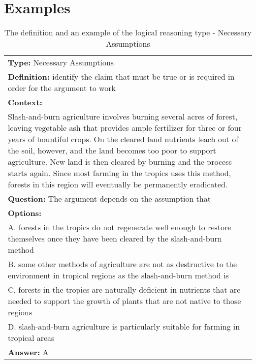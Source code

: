 \documentclass{article} \usepackage{iclr2020_conference,times}
\begin{document}
\section{Examples}
\label{append-examples}
\begin{table}[ht]
	\small
	\centering
	\caption{The definition and an example of the logical reasoning type - Necessary Assumptions}
	\begin{tabular}{|p{}|}
		\hline
		{\bf Type: } Necessary Assumptions\\
		
		{\bf Definition: }identify the claim that must be true or is required in order for the argument to work\\
		\hline
        \textbf{Context:}\\
        Slash-and-burn agriculture involves burning several acres of forest, leaving vegetable ash that provides ample fertilizer for three or four years of bountiful crops. On the cleared land nutrients leach out of the soil, however, and the land becomes too poor to support agriculture. New land is then cleared by burning and the process starts again. Since most farming in the tropics uses this method, forests in this region will eventually be permanently eradicated.\\
        \textbf{Question: } The argument depends on the assumption that\\
        \textbf{Options: }\\
        A. forests in the tropics do not regenerate well enough to restore themselves once they have been cleared by the slash-and-burn method\\
        B. some other methods of agriculture are not as destructive to the environment in tropical regions as the slash-and-burn method is\\
        C. forests in the tropics are naturally deficient in nutrients that are needed to support the growth of plants that are not native to those regions\\
        D. slash-and-burn agriculture is particularly suitable for farming in tropical areas\\
        \textbf{Answer: }A\\
		\hline
	\end{tabular}
	\label{tab:necessary-assumptions}
\end{table}
\end{document}
